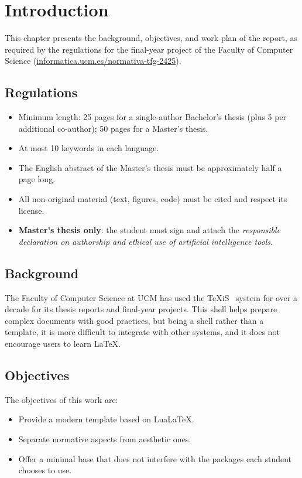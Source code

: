 \chapter{Introduction}

This chapter presents the background, objectives, and work plan of
the report, as required by the regulations for the final-year
project of the Faculty of Computer Science
(\href{https://informatica.ucm.es/normativa-tfg-2425}{informatica.ucm.es/normativa-tfg-2425}).

\section{Regulations}

\begin{itemize}\setlength{\itemsep}{0pt}
  \item Minimum length: 25 pages for a single-author Bachelor's
        thesis (plus 5 per additional co-author); 50 pages for a
        Master's thesis.
  \item At most 10 keywords in each language.
  \item The English abstract of the Master's thesis must be
        approximately half a page long.
  \item All non-original material (text, figures, code) must be
        cited and respect its license.
  \item \textbf{Master's thesis only}: the student must sign and
        attach the \emph{responsible declaration on authorship and
        ethical use of artificial intelligence tools}.
\end{itemize}

\section{Background}

The Faculty of Computer Science at UCM has used the TeXiS~\cite{texis}
system for over a decade for its thesis reports and final-year
projects. This shell helps prepare complex documents with good
practices, but being a shell rather than a template, it is more
difficult to integrate with other systems, and it does not
encourage users to learn LaTeX.

\section{Objectives}

The objectives of this work are:
\begin{itemize}
  \item Provide a modern template based on LuaLaTeX.
  \item Separate normative aspects from aesthetic ones.
  \item Offer a minimal base that does not interfere with the
        packages each student chooses to use.
\end{itemize}
